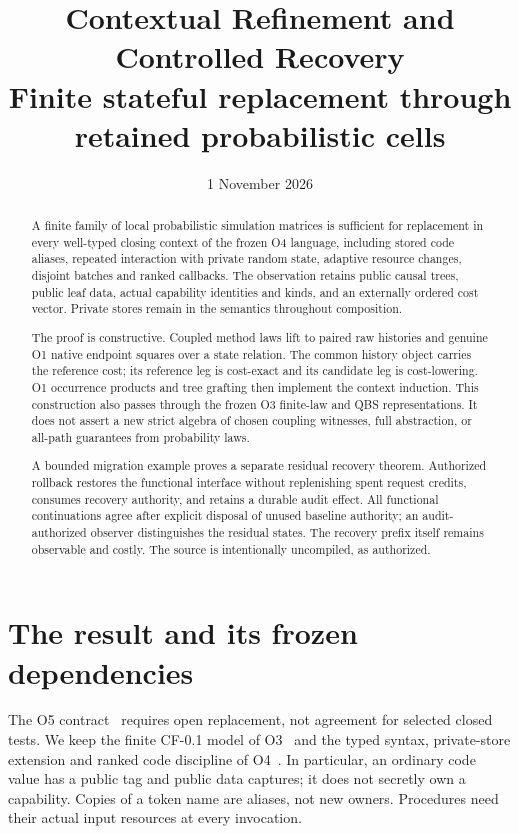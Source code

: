 \documentclass[11pt,a4paper]{article}
\title{Contextual Refinement and Controlled Recovery\\[5pt]
\large Finite stateful replacement through retained probabilistic cells}
\date{1 November 2026}
\theoremstyle{definition}
\begin{document}
\maketitle

\begin{abstract}
A finite family of local probabilistic simulation matrices is sufficient
for replacement in every well-typed closing context of the frozen O4
language, including stored code aliases, repeated interaction with private
random state, adaptive resource changes, disjoint batches and ranked
callbacks. The observation retains public causal trees, public leaf data,
actual capability identities and kinds, and an externally ordered cost
vector. Private stores remain in the semantics throughout composition.

The proof is constructive. Coupled method laws lift to paired raw
histories and genuine O1 native endpoint squares over a state relation.
The common history object carries the reference cost; its reference leg
is cost-exact and its candidate leg is cost-lowering. O1 occurrence
products and tree grafting then implement the context induction. This
construction also passes through the frozen O3 finite-law and QBS
representations. It does not assert a new strict algebra of chosen
coupling witnesses, full abstraction, or all-path guarantees from
probability laws.

A bounded migration example proves a separate residual recovery theorem.
Authorized rollback restores the functional interface without replenishing
spent request credits, consumes recovery authority, and retains a durable
audit effect. All functional continuations agree after explicit disposal
of unused baseline authority; an audit-authorized observer distinguishes
the residual states. The recovery prefix itself remains observable and
costly. The source is intentionally uncompiled, as authorized.
\end{abstract}
\tableofcontents

\section{The result and its frozen dependencies}\label{sec:scope}
The O5 contract~\cite{Contract} requires open replacement, not agreement
for selected closed tests. We keep the finite CF-0.1 model of O3~\cite{O3}
and the typed syntax, private-store extension and ranked code discipline
of O4~\cite{O4}. In particular, an ordinary code value has a public tag
and public data captures; it does not secretly own a capability. Copies
of a token name are aliases, not new owners. Procedures need their actual
input resources at every invocation.
\end{document}
